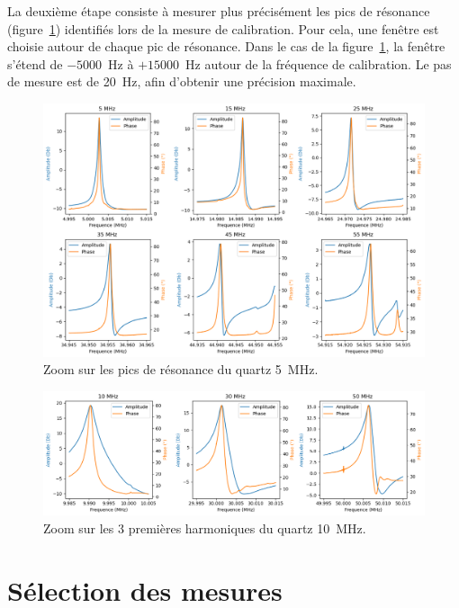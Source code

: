 La deuxième étape consiste à mesurer plus précisément les pics de résonance (figure~\ref{fig:harmonic 5MHz plot}) identifiés lors de la mesure de calibration.  
Pour cela, une fenêtre est choisie autour de chaque pic de résonance.  
Dans le cas de la figure~\ref{fig:harmonic 5MHz plot}, la fenêtre s’étend de \(-5000\)~Hz à \(+15000\)~Hz autour de la fréquence de calibration. Le pas de mesure est de 20~Hz, afin d’obtenir une précision maximale.

\begin{figure}[H]
    \centering
    \includegraphics[width=\textwidth]{assets/figures/5MhzPeak.png}
    \caption{Zoom sur les pics de résonance du quartz 5~MHz.}
    \label{fig:harmonic 5MHz plot}
\end{figure}

\begin{figure}[H]
    \centering
    \includegraphics[width=\textwidth]{assets/figures/10MhzPeak.png}
    \caption{Zoom sur les 3 premières harmoniques du quartz 10~MHz.}
    \label{fig:harmonic 10MHz plot}
\end{figure}

\section{Sélection des mesures}

